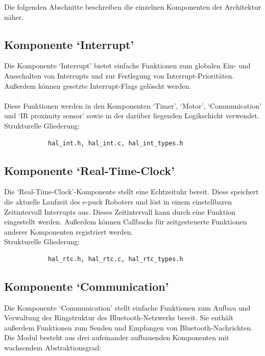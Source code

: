 \documentclass[10pt,a4paper]{article}
\begin{document}
		Die folgenden Abschnitte beschreiben die einzelnen Komponenten der Architektur näher.
		 
			\subsection{Komponente `Interrupt'}
			Die Komponente `Interrupt' bietet einfache Funktionen zum globalen Ein- und Ausschalten von Interrupts und zur Festlegung
			von Interrupt-Prioritäten. Außerdem können gesetzte Interrupt-Flags gelöscht werden. \\ \\
			Diese Funktionen werden in den Komponenten `Timer', `Motor', `Communication' und `IR proximity sensor' sowie
			in der darüber liegenden Logikschicht verwendet. \\
			
			Strukturelle Gliederung: 
			\begin{verbatim}  
			hal_int.h, hal_int.c, hal_int_types.h
			\end{verbatim}

			\subsection{Komponente `Real-Time-Clock'}
			Die `Real-Time-Clock'-Komponente stellt eine Echtzeituhr bereit. Diese speichert die aktuelle Laufzeit des e-puck Roboters und
			löst in einem einstellbaren Zeitintervall Interrupts aus. Dieses Zeitintervall kann durch eine Funktion eingestellt werden.
			Außerdem können Callbacks für zeitgesteuerte Funktionen anderer Komponenten registriert werden. \\
			
			Strukturelle Gliederung:
			\begin{verbatim}  
			hal_rtc.h, hal_rtc.c, hal_rtc_types.h
			\end{verbatim}
			
			\subsection{Komponente `Communication'}
			Die Komponente `Communication' stellt einfache Funktionen zum Aufbau und Verwaltung der Ringstruktur des Bluetooth-Netzwerks bereit.
			Sie enthält außerdem Funktionen zum Senden und Empfangen von Bluetooth-Nachrichten.\\
			 
			Die Modul besteht aus drei aufeinander aufbauenden Komponenten mit wachsendem Abstraktionsgrad:
			
\end{document}

